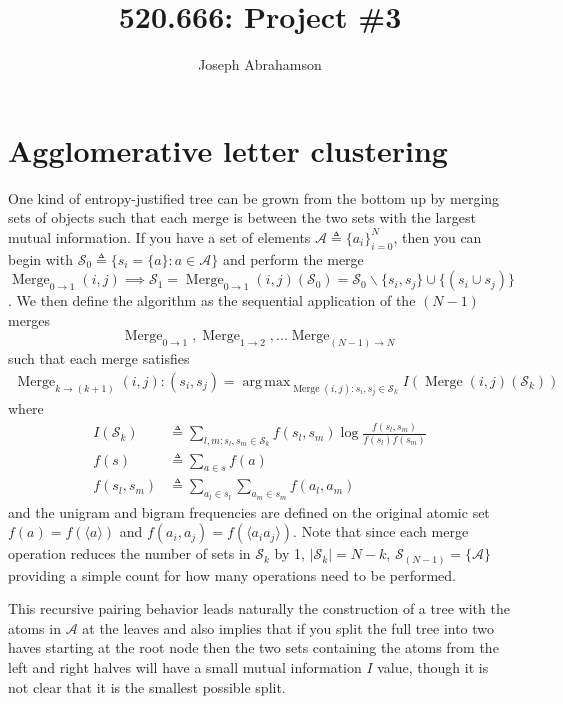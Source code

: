 \documentclass[12pt]{article}
\DeclareMathOperator*{\argmax}{arg\,max}
\DeclareMathOperator*{\Merge}{Merge}
\begin{document}
\frenchspacing

\author{Joseph Abrahamson}
\title{520.666: Project \#3}

\maketitle

\section{Agglomerative letter clustering}
\label{sec:agg}

One kind of entropy-justified tree can be grown from the bottom up by
merging sets of objects such that each merge is between the two sets
with the largest mutual information. If you have a set of elements
$\mathcal{A} \triangleq \{a_i\}_{i = 0}^N$, then you can begin with
$\mathcal{S}_0 \triangleq \{s_i = \{a\} : a \in \mathcal{A}\}$ and
perform the merge $\Merge_{0 \to 1}(i, j) \implies \mathcal{S}_1 =
\Merge_{0 \to 1}(i, j)(\mathcal{S}_0) = \mathcal{S}_0\backslash\{s_i,
s_j\} \cup \{(s_i \cup s_j)\}$. We then define the algorithm as the
sequential application of the $(N-1)$ merges $$\Merge_{0\to1},
\Merge_{1\to2}, ... \Merge_{(N-1)\to N}$$ such that each merge
satisfies
\begin{align}
  \Merge_{k\to(k+1)}(i, j) : (s_i, s_j) = \argmax_{\Merge(i, j) : s_i, s_j \in \mathcal{S}_k}
    I(\Merge(i, j)(\mathcal{S}_k))
\end{align}
where
\begin{align}
  I(\mathcal{S}_k) &\triangleq \sum_{l, m : s_l, s_m \in \mathcal{S}_k} f(s_l,
  s_m) \log\frac{f(s_l, s_m)}{f(s_l) f(s_m)} \\
  f(s) &\triangleq \sum_{a \in s} f(a) \\
  f(s_l, s_m) &\triangleq \sum_{a_l \in s_l} \sum_{a_m \in s_m} f(a_l, a_m)
\end{align}
and the unigram and bigram frequencies are defined on the original
atomic set $f(a) = f(\langle a \rangle)$ and $f(a_i, a_j) = f(\langle
a_i a_j\rangle)$. Note that since each merge operation reduces the
number of sets in $\mathcal{S}_k$ by 1, $|\mathcal{S}_k| = N-k$,
$\mathcal{S}_{(N-1)} = \{\mathcal{A}\}$ providing a
simple count for how many operations need to be performed.

This recursive pairing behavior leads naturally the construction of a
tree with the atoms in $\mathcal{A}$ at the leaves and also implies
that if you split the full tree into two haves starting at the root
node then the two sets containing the atoms from the left and right
halves will have a small mutual information $I$ value, though it is
not clear that it is the smallest possible split.
\end{document}

